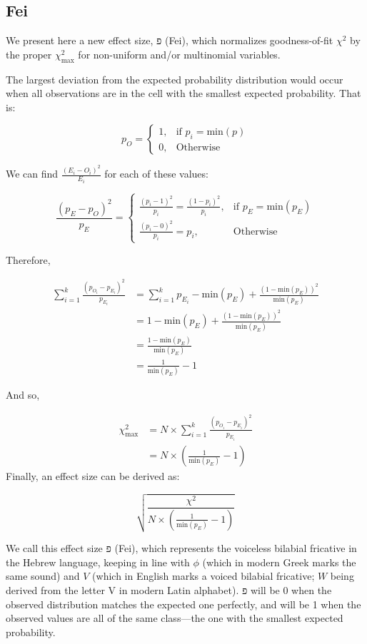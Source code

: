 \documentclass[
]{article}
\begin{document}
\hypertarget{fei}{%
\subsection{Fei}\label{fei}}

We present here a new effect size, פ (Fei), which normalizes
goodness-of-fit \(\chi^2\) by the proper \(\chi^2_\text{max}\) for
non-uniform and/or multinomial variables.

The largest deviation from the expected probability distribution would
occur when all observations are in the cell with the smallest expected
probability. That is:

\[
p_{O} = 
\begin{cases}
1, & \text{if } p_i = \text{min}(p) \\
0, & \text{Otherwise}
\end{cases}
\]

We can find \(\frac{(E_i-O_i)^2}{E_i}\) for each of these values:

\[
\frac{(p_{E}-p_{O})^2}{p_{E}} = 
\begin{cases}
\frac{(p_i-1)^2}{p_i} = \frac{(1-p_i)^2}{p_i}, & \text{if } p_{E} = \text{min}(p_{E}) \\
\frac{(p_i-0)^2}{p_i} = p_i, & \text{Otherwise}
\end{cases}
\]

Therefore,

\[
\begin{split}
\sum_{i=1}^{k}{\frac{(p_{O_i}-p_{E_i})^2}{p_{E_i}}} & = \sum_{i=1}^{k}{p_{E_i}} - \text{min}(p_{E}) + \frac{(1-\text{min}(p_{E}))^2}{\text{min}(p_{E})} \\
& = 1 - \text{min}(p_E) + \frac{(1-\text{min}(p_E))^2}{\text{min}(p_E)} \\
& = \frac{1-\text{min}(p_E)}{\text{min}(p_E)} \\
& = \frac{1}{\text{min}(p_E)} - 1
\end{split}
\]

And so,

\[
\begin{split}
\chi^2_\text{max} & = N \times \sum_{i=1}^{k}{\frac{(p_{O_i}-p_{E_i})^2}{p_{E_i}}} \\
 & = N \times (\frac{1}{\text{min}(p_E)} - 1)
\end{split}
\] Finally, an effect size can be derived as:

\[
\sqrt{\frac{\chi^2}{N \times (\frac{1}{\text{min}(p_E)} - 1)}}
\]

We call this effect size פ (Fei), which represents the voiceless
bilabial fricative in the Hebrew language, keeping in line with \(\phi\)
(which in modern Greek marks the same sound) and \(V\) (which in English
marks a voiced bilabial fricative; \(W\) being derived from the letter V
in modern Latin alphabet). פ will be 0 when the observed distribution
matches the expected one perfectly, and will be 1 when the observed
values are all of the same class---the one with the smallest expected
probability.
\end{document}
